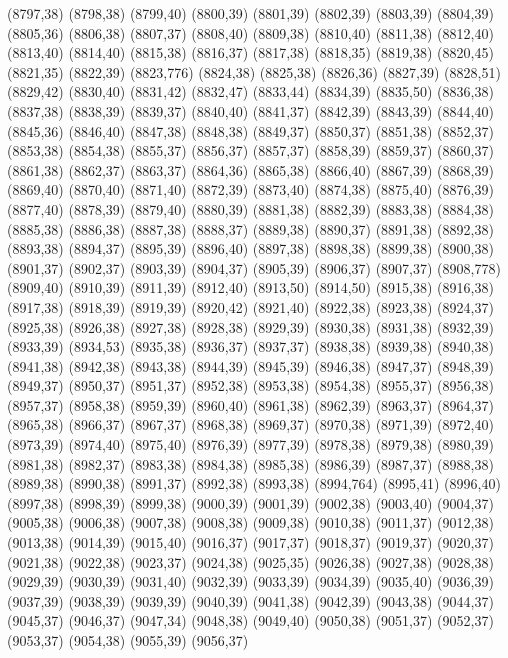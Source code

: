 (8797,38)
(8798,38)
(8799,40)
(8800,39)
(8801,39)
(8802,39)
(8803,39)
(8804,39)
(8805,36)
(8806,38)
(8807,37)
(8808,40)
(8809,38)
(8810,40)
(8811,38)
(8812,40)
(8813,40)
(8814,40)
(8815,38)
(8816,37)
(8817,38)
(8818,35)
(8819,38)
(8820,45)
(8821,35)
(8822,39)
(8823,776)
(8824,38)
(8825,38)
(8826,36)
(8827,39)
(8828,51)
(8829,42)
(8830,40)
(8831,42)
(8832,47)
(8833,44)
(8834,39)
(8835,50)
(8836,38)
(8837,38)
(8838,39)
(8839,37)
(8840,40)
(8841,37)
(8842,39)
(8843,39)
(8844,40)
(8845,36)
(8846,40)
(8847,38)
(8848,38)
(8849,37)
(8850,37)
(8851,38)
(8852,37)
(8853,38)
(8854,38)
(8855,37)
(8856,37)
(8857,37)
(8858,39)
(8859,37)
(8860,37)
(8861,38)
(8862,37)
(8863,37)
(8864,36)
(8865,38)
(8866,40)
(8867,39)
(8868,39)
(8869,40)
(8870,40)
(8871,40)
(8872,39)
(8873,40)
(8874,38)
(8875,40)
(8876,39)
(8877,40)
(8878,39)
(8879,40)
(8880,39)
(8881,38)
(8882,39)
(8883,38)
(8884,38)
(8885,38)
(8886,38)
(8887,38)
(8888,37)
(8889,38)
(8890,37)
(8891,38)
(8892,38)
(8893,38)
(8894,37)
(8895,39)
(8896,40)
(8897,38)
(8898,38)
(8899,38)
(8900,38)
(8901,37)
(8902,37)
(8903,39)
(8904,37)
(8905,39)
(8906,37)
(8907,37)
(8908,778)
(8909,40)
(8910,39)
(8911,39)
(8912,40)
(8913,50)
(8914,50)
(8915,38)
(8916,38)
(8917,38)
(8918,39)
(8919,39)
(8920,42)
(8921,40)
(8922,38)
(8923,38)
(8924,37)
(8925,38)
(8926,38)
(8927,38)
(8928,38)
(8929,39)
(8930,38)
(8931,38)
(8932,39)
(8933,39)
(8934,53)
(8935,38)
(8936,37)
(8937,37)
(8938,38)
(8939,38)
(8940,38)
(8941,38)
(8942,38)
(8943,38)
(8944,39)
(8945,39)
(8946,38)
(8947,37)
(8948,39)
(8949,37)
(8950,37)
(8951,37)
(8952,38)
(8953,38)
(8954,38)
(8955,37)
(8956,38)
(8957,37)
(8958,38)
(8959,39)
(8960,40)
(8961,38)
(8962,39)
(8963,37)
(8964,37)
(8965,38)
(8966,37)
(8967,37)
(8968,38)
(8969,37)
(8970,38)
(8971,39)
(8972,40)
(8973,39)
(8974,40)
(8975,40)
(8976,39)
(8977,39)
(8978,38)
(8979,38)
(8980,39)
(8981,38)
(8982,37)
(8983,38)
(8984,38)
(8985,38)
(8986,39)
(8987,37)
(8988,38)
(8989,38)
(8990,38)
(8991,37)
(8992,38)
(8993,38)
(8994,764)
(8995,41)
(8996,40)
(8997,38)
(8998,39)
(8999,38)
(9000,39)
(9001,39)
(9002,38)
(9003,40)
(9004,37)
(9005,38)
(9006,38)
(9007,38)
(9008,38)
(9009,38)
(9010,38)
(9011,37)
(9012,38)
(9013,38)
(9014,39)
(9015,40)
(9016,37)
(9017,37)
(9018,37)
(9019,37)
(9020,37)
(9021,38)
(9022,38)
(9023,37)
(9024,38)
(9025,35)
(9026,38)
(9027,38)
(9028,38)
(9029,39)
(9030,39)
(9031,40)
(9032,39)
(9033,39)
(9034,39)
(9035,40)
(9036,39)
(9037,39)
(9038,39)
(9039,39)
(9040,39)
(9041,38)
(9042,39)
(9043,38)
(9044,37)
(9045,37)
(9046,37)
(9047,34)
(9048,38)
(9049,40)
(9050,38)
(9051,37)
(9052,37)
(9053,37)
(9054,38)
(9055,39)
(9056,37)
